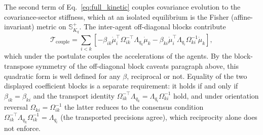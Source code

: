 The second term of Eq.~\eqref{eq:full_kinetic} couples covariance evolution to the covariance-sector stiffness, which at an isolated equilibrium is the Fisher (affine-invariant) metric on $\mathbb{S}^+_{K_q}$. The inter-agent off-diagonal blocks contribute
\begin{equation}
\mathcal{T}_{\mathrm{couple}} = \sum_{i < k}\left[-\beta_{ik}\dot{\mu}_i^\top \Omega_{ik}^{-\top}\Lambda_{q_k}\dot{\mu}_k - \beta_{ki}\dot{\mu}_i^\top \Lambda_{q_i}\Omega_{ki}^{-1} \dot{\mu}_k\right],
\end{equation}
which under the postulate couples the accelerations of the agents. By the block-transpose symmetry of the off-diagonal block caveats paragraph above, this quadratic form is well defined for any $\beta$, reciprocal or not. Equality of the two displayed coefficient blocks is a separate requirement: it holds if and only if $\beta_{ik} = \beta_{ki}$ and the transport identity $\Omega_{ik}^{-\top}\Lambda_{q_k} = \Lambda_{q_i}\Omega_{ki}^{-1}$ hold, and under orientation reversal $\Omega_{ki} = \Omega_{ik}^{-1}$ the latter reduces to the consensus condition $\Omega_{ik}^{-\top}\Lambda_{q_k}\Omega_{ik}^{-1} = \Lambda_{q_i}$ (the transported precisions agree), which reciprocity alone does not enforce.
